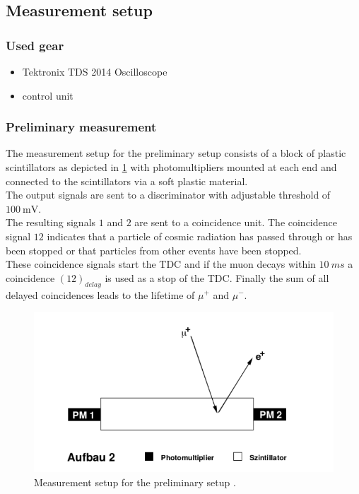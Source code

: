 \documentclass[english,  %
parskip=full,   %
headsepline]{scrartcl}
\begin{document}
\subsection{Measurement setup}
\subsubsection{Used gear}
    \begin{itemize}
        \item Tektronix TDS 2014 Oscilloscope
        \item control unit
    \end{itemize}
\subsubsection{Preliminary measurement}
The measurement setup for the preliminary setup
consists of a block of plastic scintillators as depicted in \cref{fig:setup2} with photomultipliers mounted at each end and connected to the scintillators via a soft plastic material.\\
The output signals are sent to a discriminator with adjustable threshold of $\SI{100}{\milli \volt}$.\\
The resulting signals $\mathfrak{1}$ and $\mathfrak{2}$ are sent to a coincidence unit. The coincidence signal $\mathfrak{12}$ indicates that a particle of cosmic radiation has passed through or has been stopped or that particles from other events have been stopped.\\
These coincidence signals start the TDC and if the muon decays within $\SI{10}{ms}$ a coincidence $(\mathfrak{12})_{delay}$ is used as a stop of the TDC. Finally the sum of all delayed coincidences leads to the lifetime of $\mu^+$ and $\mu^-$.

\begin{figure}[H]
    \centering
    \includegraphics[width=0.6\linewidth]{setup2.png}
    \caption{Measurement setup for the preliminary setup \cite{anleitung}.}
    \label{fig:setup2}
\end{figure}
\end{document}
